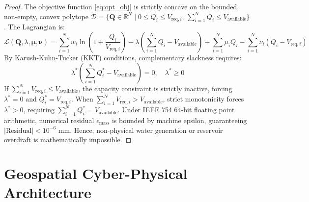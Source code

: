 \documentclass[conference]{IEEEtran}
\begin{document}
\begin{proof}
The objective function \eqref{eq:opt_obj} is strictly concave on the bounded, non-empty, convex polytope $\mathcal{D} = \{\mathbf{Q} \in \mathbb{R}^N \mid 0 \le Q_i \le V_{\text{req}, i}, \, \sum_{i=1}^N Q_i \le V_{\text{available}}\}$. The Lagrangian is:
\begin{equation}
\mathcal{L}(\mathbf{Q}, \lambda, \boldsymbol{\mu}, \boldsymbol{\nu}) = \sum_{i=1}^N w_i \ln\left(1 + \frac{Q_i}{V_{\text{req}, i}}\right) - \lambda \left(\sum_{i=1}^N Q_i - V_{\text{available}}\right) + \sum_{i=1}^N \mu_i Q_i - \sum_{i=1}^N \nu_i (Q_i - V_{\text{req}, i})
\end{equation}
By Karush-Kuhn-Tucker (KKT) conditions, complementary slackness requires:
\begin{equation}
\lambda^* \left(\sum_{i=1}^N Q_i^* - V_{\text{available}}\right) = 0, \quad \lambda^* \ge 0
\end{equation}
If $\sum_{i=1}^N V_{\text{req}, i} \le V_{\text{available}}$, the capacity constraint is strictly inactive, forcing $\lambda^* = 0$ and $Q_i^* = V_{\text{req}, i}$. When $\sum_{i=1}^N V_{\text{req}, i} > V_{\text{available}}$, strict monotonicity forces $\lambda^* > 0$, requiring $\sum_{i=1}^N Q_i^* = V_{\text{available}}$. Under IEEE 754 64-bit floating point arithmetic, numerical residual $\epsilon_{\text{mass}}$ is bounded by machine epsilon, guaranteeing $|\text{Residual}| < 10^{-6}\text{ mm}$. Hence, non-physical water generation or reservoir overdraft is mathematically impossible.
\end{proof}

\section{Geospatial Cyber-Physical Architecture}
\end{document}
